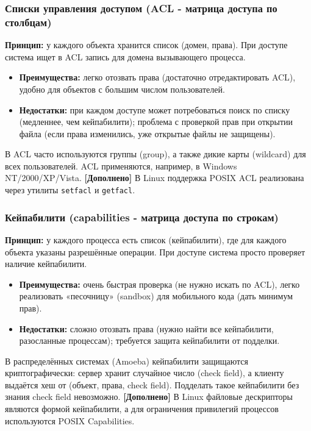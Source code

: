 \documentclass[a4paper,12pt]{article}
\begin{document}
\subsubsection{Списки управления доступом (ACL - матрица доступа по столбцам)}
\textbf{Принцип:} у каждого объекта хранится список (домен, права). При доступе система ищет в ACL запись для домена вызывающего процесса.
\begin{itemize}
    \item \textbf{Преимущества:} легко отозвать права (достаточно отредактировать ACL), удобно для объектов с большим числом пользователей.
    \item \textbf{Недостатки:} при каждом доступе может потребоваться поиск по списку (медленнее, чем кейпабилити); проблема с проверкой прав при открытии файла (если права изменились, уже открытые файлы не защищены).
\end{itemize}
В ACL часто используются группы (group), а также дикие карты (wildcard) для всех пользователей. ACL применяются, например, в Windows NT/2000/XP/Vista. \textbf{[Дополнено]} В Linux поддержка POSIX ACL реализована через утилиты \texttt{setfacl} и \texttt{getfacl}.

\subsubsection{Кейпабилити (capabilities - матрица доступа по строкам)}
\textbf{Принцип:} у каждого процесса есть список (кейпабилити), где для каждого объекта указаны разрешённые операции. При доступе система просто проверяет наличие кейпабилити.
\begin{itemize}
    \item \textbf{Преимущества:} очень быстрая проверка (не нужно искать по ACL), легко реализовать «песочницу» (sandbox) для мобильного кода (дать минимум прав).
    \item \textbf{Недостатки:} сложно отозвать права (нужно найти все кейпабилити, разосланные процессам); требуется защита кейпабилити от подделки.
\end{itemize}
В распределённых системах (Amoeba) кейпабилити защищаются криптографически: сервер хранит случайное число (check field), а клиенту выдаётся хеш от (объект, права, check field). Подделать такое кейпабилити без знания check field невозможно. \textbf{[Дополнено]} В Linux файловые дескрипторы являются формой кейпабилити, а для ограничения привилегий процессов используются POSIX Capabilities.
\end{document}
